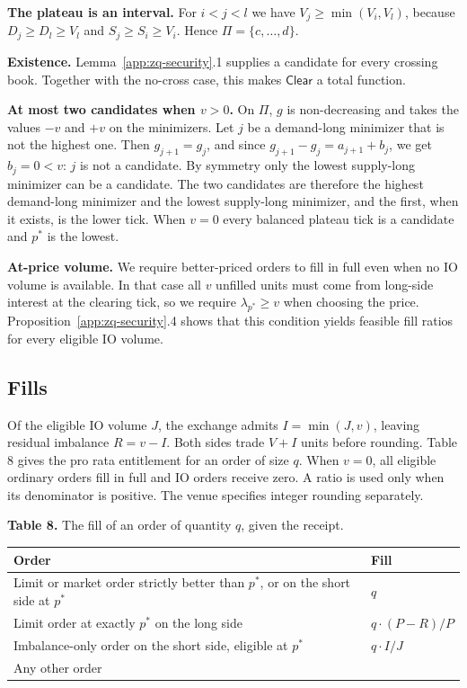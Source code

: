 \textbf{The plateau is an interval.} For \(i < j < l\) we have \(V_j \ge \min(V_i, V_l)\), because \(D_j \ge D_l \ge V_l\) and \(S_j \ge S_i \ge V_i\). Hence \(\Pi = \{c, \ldots, d\}\).

\textbf{Existence.} Lemma~\ref{app:zq-security}.1 supplies a candidate for every crossing book. Together with the no-cross case, this makes \(\mathsf{Clear}\) a total function.

\textbf{At most two candidates when \(v > 0\).} On \(\Pi\), \(g\) is non-decreasing and takes the values \(-v\) and \(+v\) on the minimizers. Let \(j\) be a demand-long minimizer that is not the highest one. Then \(g_{j+1} = g_j\), and since \(g_{j+1} - g_j = a_{j+1} + b_j\), we get \(b_j = 0 < v\): \(j\) is not a candidate. By symmetry only the lowest supply-long minimizer can be a candidate. The two candidates are therefore the highest demand-long minimizer and the lowest supply-long minimizer, and the first, when it exists, is the lower tick. When \(v = 0\) every balanced plateau tick is a candidate and \(p^*\) is the lowest.

\textbf{At-price volume.} We require better-priced orders to fill in full even when no IO volume is available. In that case all \(v\) unfilled units must come from long-side interest at the clearing tick, so we require \(\lambda_{p^*}\ge v\) when choosing the price. Proposition~\ref{app:zq-security}.4 shows that this condition yields feasible fill ratios for every eligible IO volume.

\subsection{Fills}
\label{app:zq-fills}

Of the eligible IO volume \(J\), the exchange admits \(I=\min(J,v)\), leaving residual imbalance \(R=v-I\). Both sides trade \(V+I\) units before rounding. Table 8 gives the pro rata entitlement for an order of size \(q\). When \(v=0\), all eligible ordinary orders fill in full and IO orders receive zero. A ratio is used only when its denominator is positive. The venue specifies integer rounding separately.

\textbf{Table 8.} The fill of an order of quantity \(q\), given the receipt.

\begin{longtable}{@{}
  >{\raggedright\arraybackslash}p{}
  >{\raggedright\arraybackslash}p{}
@{}}
\toprule
Order & Fill \\
\midrule
\endhead
\bottomrule
\endlastfoot

Limit or market order strictly better than \(p^*\), or on the short side at \(p^*\)
  & \(q\) \\
Limit order at exactly \(p^*\) on the long side
  & \(q \cdot (P - R)/P\) \\
Imbalance-only order on the short side, eligible at \(p^*\)
  & \(q \cdot I/J\) \\
Any other order
  & 0 \\
\end{longtable}

